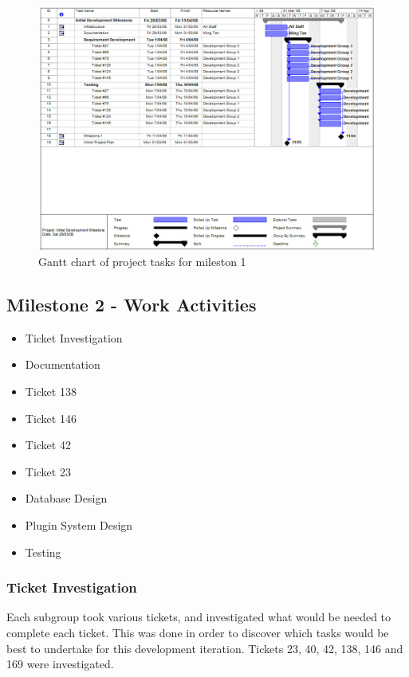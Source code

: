 \documentclass{article}
\begin{document}
\begin{figure}[htp]
\begin{centering}
\includegraphics[angle=90,scale=0.5]{./schedule.jpg} 
\par\end{centering}
\caption{Gantt chart of project tasks for mileston 1}
\label{fig:schedule} 
\end{figure}

\newpage

\subsection{Milestone 2 - Work Activities}

\begin{itemize}
\item Ticket Investigation
\item Documentation
\item Ticket 138
\item Ticket 146
\item Ticket 42
\item Ticket 23
\item Database Design
\item Plugin System Design 
\item Testing
\end{itemize}

\subsubsection{Ticket Investigation}
	Each subgroup took various tickets, and investigated what would be needed to complete each ticket. This was done in order to discover which tasks would be best to undertake for this development iteration. Tickets 23, 40, 42, 138, 146 and 169 were investigated.\\
	
\end{document}
